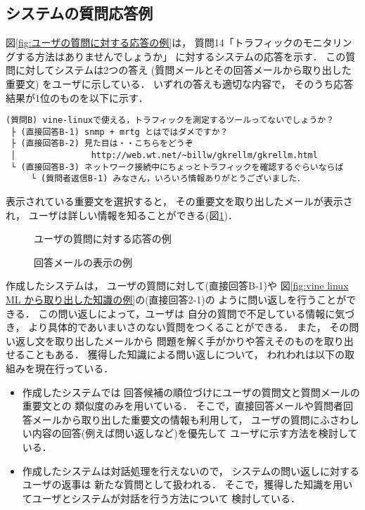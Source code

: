   \subsection{システムの質問応答例}

  図\ref{fig:ユーザの質問に対する応答の例}は，
  質問14「トラフィックのモニタリングする方法はありませんでしょうか」
  に対するシステムの応答を示す．
  この質問に対してシステムは2つの答え
  (質問メールとその回答メールから取り出した重要文) をユーザに示している．
  いずれの答えも適切な内容で，
  そのうち応答結果が1位のものを以下に示す．
\begin{verbatim}
(質問B) vine-linuxで使える，トラフィックを測定するツールってないでしょうか？
 ├ (直接回答B-1) snmp + mrtg とはではダメですか？
 ├ (直接回答B-2) 見た目は・・こちらをどうぞ
 │               http://web.wt.net/~billw/gkrellm/gkrellm.html
 └ (直接回答B-3) ネットワーク接続中にちょっとトラフィックを確認するぐらいならば
     └ (質問者返信B-1) みなさん，いろいろ情報ありがとうございました．
\end{verbatim}
   表示されている重要文を選択すると，
   その重要文を取り出したメールが表示され，
   ユーザは詳しい情報を知ることができる(図\ref{fig:回答メールの表示の例})．


  \begin{figure}[p]
   \begin{center}
    \caption{ユーザの質問に対する応答の例}
    \label{fig:ユーザの質問に対する応答の例}

    \vspace{12mm}

    \caption{回答メールの表示の例}
    \label{fig:回答メールの表示の例}
   \end{center}
  \end{figure}


   作成したシステムは，
   ユーザの質問に対して(直接回答B-1)や
   図\ref{fig:vine linux ML から取り出した知識の例}の(直接回答2-1)の
   ように問い返しを行うことができる．
   この問い返しによって，ユーザは
   自分の質問で不足している情報に気づき，
   より具体的であいまいさのない質問をつくることができる．
   また，
   その問い返し文を取り出したメールから
   問題を解く手がかりや答えそのものを取り出せることもある．
   獲得した知識による問い返しについて，
   われわれは以下の取組みを現在行っている．
   \begin{itemize}
    \item 作成したシステムでは
	  回答候補の順位づけにユーザの質問文と質問メールの重要文との
	  類似度のみを用いている．
	  そこで，直接回答メールや質問者回答メールから取り出した重要文の情報も利用して，
	  ユーザの質問にふさわしい内容の回答(例えば問い返しなど)を優先して
	  ユーザに示す方法を検討している．

    \item 作成したシステムは対話処理を行えないので，
	  システムの問い返しに対するユーザの返事は
	  新たな質問として扱われる．
	  そこで，獲得した知識を用いてユーザとシステムが対話を行う方法について
	  検討している．

   \end{itemize}


